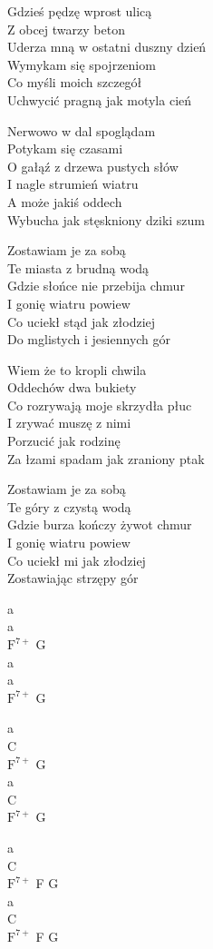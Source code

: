 \begin{text}
Gdzieś pędzę wprost ulicą\\
Z obcej twarzy beton\\
Uderza mną w ostatni duszny dzień\\
Wymykam się spojrzeniom\\
Co myśli moich szczegół\\
Uchwycić pragną jak motyla cień

Nerwowo w dal spoglądam\\
Potykam się czasami\\
O gałąź z drzewa pustych słów\\
I nagle strumień wiatru\\
A może jakiś oddech\\
Wybucha jak stęskniony dziki szum

\vin Zostawiam je za sobą\\
\vin Te miasta z brudną wodą\\
\vin Gdzie słońce nie przebija chmur\\
\vin I gonię wiatru powiew\\
\vin Co uciekł stąd jak złodziej\\
\vin Do mglistych i jesiennych gór

Wiem że to kropli chwila\\
Oddechów dwa bukiety\\
Co rozrywają moje skrzydła płuc\\
I zrywać muszę z nimi\\
Porzucić jak rodzinę\\
Za łzami spadam jak zraniony ptak

\vin Zostawiam je za sobą\\
\vin Te góry z czystą wodą\\
\vin Gdzie burza kończy żywot chmur\\
\vin I gonię wiatru powiew\\
\vin Co uciekł mi jak złodziej\\
\vin Zostawiając strzępy gór
\end{text}
\begin{chord}
    a\\
    a\\
    $\mathrm{F^{7+}}$ G\\
    a\\
    a\\
    $\mathrm{F^{7+}}$ G

    a\\
    C\\
    $\mathrm{F^{7+}}$ G\\
    a\\
    C\\
    $\mathrm{F^{7+}}$ G

    a\\
    C\\
    $\mathrm{F^{7+}}$ F G\\
    a\\
    C\\
    $\mathrm{F^{7+}}$ F G
\end{chord}
